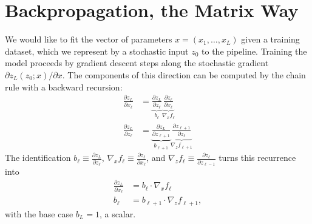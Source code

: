 \documentclass{article}
\begin{document}
\section{Backpropagation, the Matrix Way}

We would like to fit the vector of parameters $x = (x_1, \ldots, x_L)$ given a
training dataset, which we represent by a stochastic input $z_0$ to the
pipeline. Training the model proceeds by gradient descent steps along the
stochastic gradient $\partial z_L(z_0;x) / \partial x$. The components of this
direction can be computed by the chain rule with a backward recursion:
\begin{align*}
    \frac{\partial z_L}{\partial x_\ell} & = \underbrace{\frac{\partial z_L}{\partial z_{\ell}}}_{b_\ell} \underbrace{\frac{\partial z_\ell}{\partial x_\ell}}_{\nabla_x f_\ell}               \\
    \frac{\partial z_L}{\partial z_\ell} & = \underbrace{\frac{\partial z_L}{\partial z_{\ell+1}}}_{b_{\ell+1}} \underbrace{\frac{\partial z_{\ell+1}}{\partial z_\ell}}_{\nabla_z f_{\ell+1}}
\end{align*}
The identification $b_\ell \equiv \frac{\partial z_L}{\partial z_\ell}$, $\nabla_x f_\ell \equiv \frac{\partial z_\ell}{\partial x_\ell}$, and $\nabla_z f_\ell \equiv \frac{\partial z_\ell}{\partial z_{\ell-1}}$ turns this recurrence into
\begin{align*}
    \frac{\partial z_L}{\partial x_\ell} & = b_\ell \cdot \nabla_x f_\ell          \\
    b_\ell                               & = b_{\ell+1} \cdot \nabla_z f_{\ell+1},
\end{align*}
with the base case $b_L = 1$, a scalar.
\end{document}
